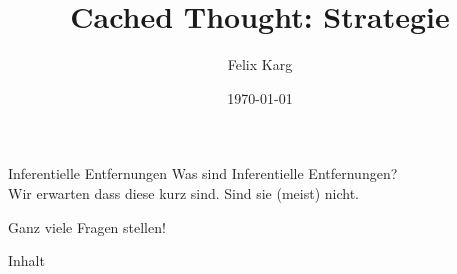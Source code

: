 \documentclass[12pt,compress,ngerman,utf8,t]{beamer}
\date{\today}
\institute{University of Freiburg}
\title{Cached Thought: Strategie}
\author{Felix Karg}
\begin{document}
\begin{frame}[c]{Inferentielle Entfernungen}
    \large
    Was sind Inferentielle Entfernungen? \\ \pause
    Wir erwarten dass diese kurz sind. Sind sie (meist) nicht.
\end{frame}


\begin{frame}[standout]
    Ganz viele Fragen stellen!
\end{frame}


\maketitle



\begin{frame}{Inhalt}
    \small
    \begin{multicols}{2}
        \small
        \tableofcontents[hidesubsections]
    \end{multicols}
    \clearpage
\end{frame}









\end{document}
